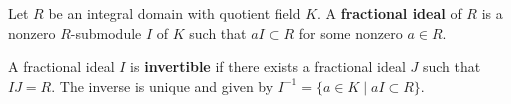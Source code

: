 Let $R$ be an integral domain with quotient field $K$. A \textbf{fractional ideal} of $R$ is a nonzero $R$-submodule $I$ of $K$ such that $aI \subset R$ for some nonzero $a \in R$.

A fractional ideal $I$ is \textbf{invertible} if there exists a fractional ideal $J$ such that $IJ = R$. The inverse is unique and given by $I^{-1} = \{a \in K \mid aI \subset R\}$.
